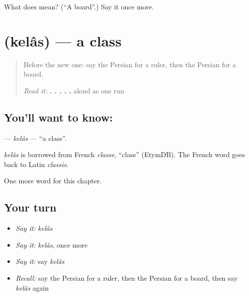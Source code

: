 \begin{tcolorbox}[breakable,colback=teal!4,colframe=teal!35!black,title={Before you move on}]
What does  mean? (\textquotedblleft{}A board\textquotedblright{}.) Say it once more.
\end{tcolorbox}
\section[\texorpdfstring{\fa{کلاس} (kelâs)}{کلاس (kelâs)}]{ (kelâs) — a class}

\label{lesson:FA-C114-kelas}



\begin{quote}
Before the new one: say the Persian for a ruler, then the Persian for a board.

\emph{Read it:} \textbf{. . . . .} aloud as one run
\end{quote}

\subsection*{You'll want to know: }
\textbf{} — \emph{kelâs} — \textquotedblleft{}a class\textquotedblright{}.

\begin{cousinweb}
\emph{kelâs} is borrowed from French \emph{classe}, \textquotedblleft{}class\textquotedblright{} (EtymDB). The French word goes back to Latin \emph{classis}.
\end{cousinweb}

\begin{grammarlens}[title={What you've built}]
One more word for this chapter.
\end{grammarlens}

\subsection*{Your turn}
\begin{itemize}
\raggedright
  \item \emph{Say it:} \emph{kelâs}
  \item \emph{Say it:} \emph{kelâs}, once more
  \item \emph{Say it:} say \emph{kelâs}
  \item \emph{Recall:} say the Persian for a ruler, then the Persian for a board, then say \emph{kelâs} again
\end{itemize}

